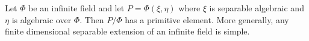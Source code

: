 Let $\Phi$ be an infinite field and let $P = \Phi(\xi, \eta)$ where $\xi$ is separable algebraic and $\eta$ is algebraic over $\Phi$. Then $P/\Phi$ has a primitive element. More generally, any finite dimensional separable extension of an infinite field is simple.
